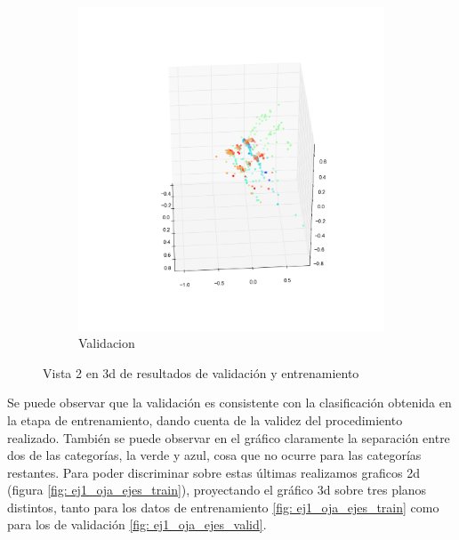 \begin{figure}[H]
\begin{subfigure}[b]{0.5\textwidth}
                \includegraphics[width=\linewidth]{secciones/graficos/oja/2_train.png}
                \caption{Validacion}
                \label{fig: ej1_oja_3d_2_valid}
        \end{subfigure}
        \caption{Vista 2 en 3d de resultados de validación y entrenamiento}
        \label{fig: ej1_oja_3d_2}
\end{figure}


\par Se puede observar que la validación es consistente con la clasificación obtenida en la etapa de entrenamiento, dando cuenta de la validez del procedimiento realizado. También se puede observar en el gráfico claramente la separación entre dos de las categorías, la verde y azul, cosa que no ocurre para las categorías restantes. Para poder discriminar sobre estas últimas realizamos graficos 2d (figura \ref{fig: ej1_oja_ejes_train}), proyectando el gráfico 3d sobre tres planos distintos, tanto para los datos de entrenamiento \ref{fig: ej1_oja_ejes_train}  como para los de validación \ref{fig: ej1_oja_ejes_valid}.

